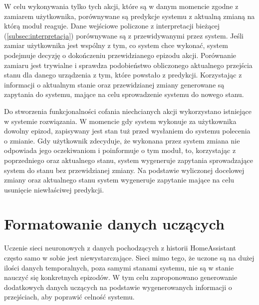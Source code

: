 W celu wykonywania tylko tych akcji, które są w danym momencie zgodne z zamiarem użytkownika, porównywane są predykcje systemu z aktualną zmianą na którą moduł reaguje. Dane wejściowe policzone z interpretacji bieżącej (\ref{subsec:interpretacja}) porównywane są z przewidywanymi przez system. Jeśli zamiar użytkownika jest wspólny z tym, co system chce wykonać, system podejmuje decyzję o dokończeniu przewidzianego epizodu akcji. Porównanie zamiaru jest trywialne i sprawdza podobieństwo obliczonego aktualnego przejścia stanu dla danego urządzenia z tym, które powstało z predykcji. Korzystając z informacji o aktualnym stanie oraz przewidzianej zmiany generowane są zapytania do systemu, mające na celu sprowadzenie systemu do nowego stanu.

Do stworzenia funkcjonalności cofania niechcianych akcji wykorzystano istniejące w systemie rozwiązania. W momencie gdy system wykonuje za użytkownika dowolny epizod, zapisywany jest stan tuż przed wysłaniem do systemu polecenia o zmianie. Gdy użytkownik zdecyduje, że wykonana przez system zmiana nie odpowiada jego oczekiwaniom i poinformuje o tym moduł, to, korzystając z poprzedniego oraz aktualnego stanu, system wygeneruje zapytania sprowadzające system do stanu bez przewidzianej zmiany. Na podstawie wyliczonej docelowej zmiany oraz aktualnego stanu system wygeneruje zapytanie mające na celu usunięcie niewłaściwej predykcji.

\section{Formatowanie danych uczących} \label{sec:dane_uczace}
Uczenie sieci neuronowych z danych pochodzących z historii HomeAssistant często samo w sobie jest niewystarczające. Sieci mimo tego, że uczone są na dużej ilości danych temporalnych, poza samymi stanami systemu, nie są w stanie nauczyć się konkretnych epizodów. W tym celu zaproponowano generowanie dodatkowych danych uczących na podstawie wygenerowanych informacji o przejściach, aby poprawić celność systemu.


